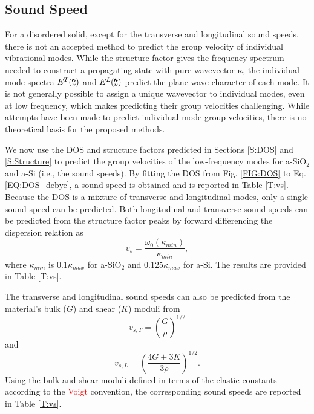 \documentclass[aps,prb,onecolumn,preprint,superscriptaddress,footinbib,amsmath,amssymb,floatfix]{revtex4}
\newcommand{\kv}{\mspace{-4.0mu}\left(\mspace{-8.0mu}
\begin{smallmatrix}&\pmb{\kappa} \\&\nu\end{smallmatrix}
\mspace{-3.0mu}\right)}
\begin{document}
\subsection{\label{S:Vg}Sound Speed}

For a disordered solid,
except for the transverse and longitudinal sound speeds, there is not an
accepted method to predict the group velocity of individual 
vibrational modes.
While the structure factor gives the frequency spectrum needed to
construct a propagating state with pure wavevector $\pmb{\kappa}$,
the individual mode spectra $E^{T}\kv$ and $E^{L}\kv$ predict the
plane-wave character of each mode.
\cite{allen_diffusons_1999}
It is not generally possible
to assign a unique wavevector to individual modes, even at low frequency,
\cite{allen_diffusons_1999}
which makes predicting their group velocities challenging.
While attempts have been made to predict individual mode group velocities,
\cite{duda_reducing_2011,donadio_atomistic_2009,
he_heat_2011,hori_phonon_2013}
there is no theoretical basis for the proposed methods.

We now use the DOS and structure factors predicted in
Sections \ref{S:DOS} and \ref{S:Structure} to
predict the group velocities of the low-frequency modes for
a-SiO$_2$ and a-Si (i.e., the sound speeds). By fitting the DOS
from Fig. \ref{FIG:DOS} to Eq. \eqref{EQ:DOS_debye}, 
a sound speed is obtained and is 
reported in Table \ref{T:vs}. Because the DOS is a mixture of
transverse and longitudinal modes, only a single sound speed can be
predicted. 
Both longitudinal and transverse sound speeds can be predicted from
the structure factor peaks by forward differencing the dispersion relation as
\begin{equation}\label{EQ:vs_dwdk}
v_{s} = \frac{\omega_0(\kappa_{min})}{\kappa_{min}},
\end{equation}
where $\kappa_{min}$ is $0.1\kappa_{max}$ for a-SiO$_2$ and 
$0.125\kappa_{max}$ for a-Si. The results are provided in 
Table \ref{T:vs}.

The transverse and longitudinal sound speeds can
also be predicted from the material's bulk ($G$) and
shear ($K$) moduli from\cite{gale_general_2003} 
\begin{equation}\label{EQ:vs_T_elas}
v_{s,T} = \left(\frac{G}{\rho}\right)^{1/2}
\end{equation}
and
\begin{equation}\label{EQ:vs_L_elas}
v_{s,L} = \left(\frac{4G + 3K}{3\rho}\right)^{1/2}.
\end{equation}
Using the bulk and shear moduli defined in terms of the elastic
constants according to the \textcolor{red}{Voigt} 
convention,\cite{gale_general_2003} 
the corresponding sound speeds are reported in Table \ref{T:vs}.
 
\end{document}

